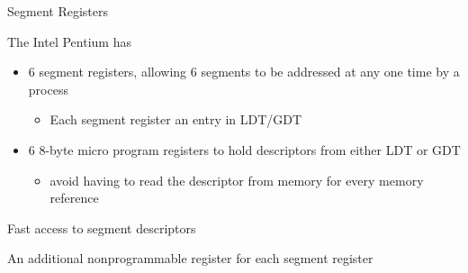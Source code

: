 \begin{frame}{Segment Registers}
  \begin{iblock}{The Intel Pentium has}
    \begin{itemize}
    \item \alert{6 segment registers}, allowing 6 segments to be addressed at
      any one time by a process
      \begin{itemize}
      \item Each segment register {\pright} an entry in LDT/GDT
      \end{itemize}
    \item \alert{6 8-byte micro program registers} to hold descriptors from either LDT or GDT
      \begin{itemize}
      \item avoid having to read the descriptor from memory for every memory reference
      \end{itemize}
    \end{itemize}
  \end{iblock}
  \begin{center}
     
  \end{center}

\end{frame}

\begin{frame}{Fast access to segment descriptors}
  \begin{iblock}{An additional nonprogrammable register for each segment register}
    \begin{center}
    \end{center}
  \end{iblock}
\end{frame}

